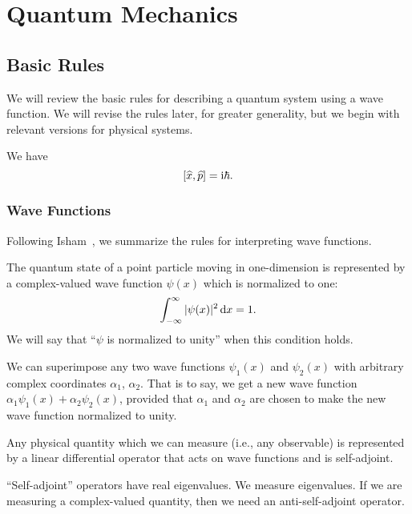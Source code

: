 \chapter{Quantum Mechanics}

\section{Basic Rules}\label{sec:qm:basic-rules}

\M We will review the basic rules for describing a quantum system using
a wave function. We will revise the rules later, for greater generality,
but we begin with relevant versions for physical systems.

We have
\begin{equation}\label{eq:position-momentum-uncertainty-commutator}
[\widehat{x},\widehat{p}] = \mathrm{i}\hbar.
\end{equation}


\subsection{Wave Functions}

\M Following Isham~\cite{Isham:1995lq}, we summarize the rules for
interpreting wave functions.

The quantum state of a point particle moving in one-dimension is
represented by a complex-valued wave function $\psi(x)$ which is
normalized to one:
\begin{equation}
\int^{\infty}_{-\infty}|\psi(x)|^{2}\,\mathrm{d} x = 1.
\end{equation}
We will say that ``$\psi$ is normalized to unity'' when this condition holds.

We can superimpose any two wave functions $\psi_{1}(x)$ and
$\psi_{2}(x)$ with arbitrary complex coordinates $\alpha_{1}$, $\alpha_{2}$.
That is to say, we get a new wave function
$\alpha_{1}\psi_{1}(x) + \alpha_{2}\psi_{2}(x)$, provided that
$\alpha_{1}$ and $\alpha_{2}$ are chosen to make the new wave function
normalized to unity.

Any physical quantity which we can measure (i.e., any observable) is
represented by a linear differential operator that acts on wave functions
and is self-adjoint.

\begin{remark}
``Self-adjoint'' operators have real eigenvalues. We measure
eigenvalues. If we are measuring a complex-valued quantity, then we
need an anti-self-adjoint operator.
\end{remark}

